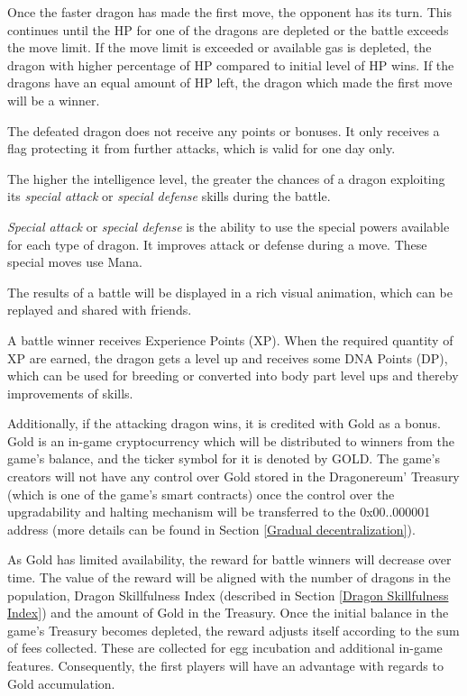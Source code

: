 \documentclass[12pt]{article}
\begin{document}
Once the faster dragon has made the first move, the opponent has its turn. This continues until the HP for one of the dragons are depleted or the battle exceeds the move limit. If the move limit is exceeded or available gas is depleted, the dragon with higher percentage of HP compared to initial level of HP wins. If the dragons have an equal amount of HP left, the dragon which made the first move will be a winner.\par

The defeated dragon does not receive any points or bonuses. It only receives a flag protecting it from further attacks, which is valid for one day only.\par

The higher the intelligence level, the greater the chances of a dragon exploiting its \textit{special attack} or \textit{special defense} skills during the battle.\par

\textit{Special attack} or \textit{special defense} is the ability to use the special powers available for each type of dragon. It improves attack or defense during a move. These special moves use Mana.\par

The results of a battle will be displayed in a rich visual animation, which can be replayed and shared with friends.\par

A battle winner receives Experience Points (XP). When the required quantity of XP are earned, the dragon gets a level up and receives some DNA Points (DP), which can be used for breeding or converted into body part level ups and thereby improvements of skills. \par

Additionally, if the attacking dragon wins, it is credited with Gold as a bonus. Gold is an in-game cryptocurrency which will be distributed to winners from the game’s balance, and the ticker symbol for it is denoted by GOLD. The game’s creators will not have any control over Gold stored in the Dragonereum’ Treasury (which is one of the game’s smart contracts) once the control over the upgradability and halting mechanism will be transferred to the 0x00..000001 address (more details can be found in Section \ref{Gradual decentralization}).\par

As Gold has limited availability, the reward for battle winners will decrease over time. The value of the reward will be aligned with the number of dragons in the population, Dragon Skillfulness Index (described in Section \ref{Dragon Skillfulness Index}) and the amount of Gold in the Treasury. Once the initial balance in the game's Treasury becomes depleted, the reward adjusts itself according to the sum of fees collected. These are collected for egg incubation and additional in-game features. Consequently, the first players will have an advantage with regards to Gold accumulation.\par
\end{document}
